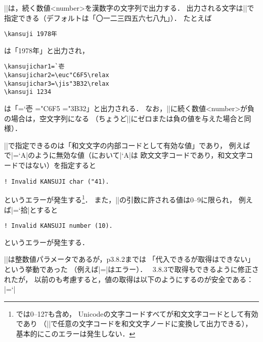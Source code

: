 \documentclass[a4paper,11pt,nomag,dvipdfmx]{jsarticle}
\begin{document}
\begin{cslist}
\csitem[\.{kansuji} <number>, \.{kansujichar} <0--9>=<kanji code>]
  |\kansuji|は，続く数値<number>を漢数字の文字列で出力する．
  出力される文字は|\kansujichar|で指定できる（デフォルトは「〇一二三四五六七八九」）．
  たとえば
\begin{verbatim}
\kansuji 1978年
\end{verbatim}
  は「\kansuji 1978年」と出力され，
\begin{verbatim}
\kansujichar1=`壱
\kansujichar2=\euc"C6F5\relax
\kansujichar3=\jis"3B32\relax
\kansuji 1234
\end{verbatim}
  は「{=`壱 =\euc"C6F5\relax
       =\jis"3B32\relax {}}」と出力される．
  なお，|\kansuji|に続く数値<number>が負の場合は，空文字列になる
  （ちょうど|\romannumeral|にゼロまたは負の値を与えた場合と同様）．

  |\kansujichar|で指定できるのは「和文文字の内部コードとして有効な値」であり，
  例えば\pTeX で|=`A|のように無効な値（\pTeX において|`A|は
  欧文文字コードであり，和文文字コードではない）を指定すると
\begin{verbatim}
! Invalid KANSUJI char ("41).
\end{verbatim}
  というエラーが発生する\footnote{\upTeX では0--127も含め，
  Unicodeの文字コードすべてが和文文字コードとして有効であり
  （|\kchar|で任意の文字コードを和文文字ノードに変換して出力できる），
  基本的にこのエラーは発生しない．}．
  また，|\kansujichar|の引数に許される値は0--9に限られ，
  例えば|=`拾|とすると
\begin{verbatim}
! Invalid KANSUJI number (10).
\end{verbatim}
  というエラーが発生する．
\end{cslist}

\begin{dangerous}
  |\kansujichar|は整数値パラメータであるが，p3.8.2までは
  「代入できるが取得はできない」という挙動であった
  （例えば|=|はエラー）．
  \pTeX~3.8.3で取得もできるように修正された\cite{tjb93}が，
  以前の\pTeX も考慮すると，値の取得は以下のようにするのが安全である：
  |=\expandafter`|
\end{dangerous}
\end{document}
